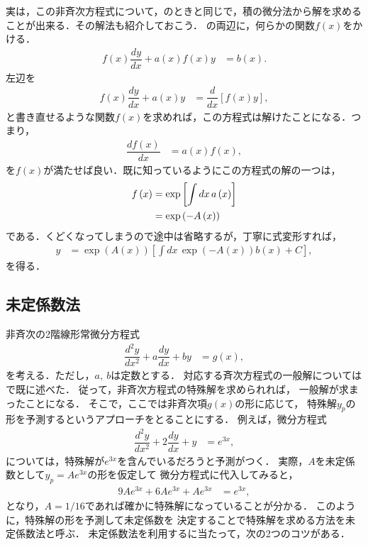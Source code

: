 実は，この非斉次方程式について，のときと同じで，積の微分法から解を求めることが出来る．その解法も紹介しておこう．
の両辺に，何らかの関数$f\left(x\right)$をかける．
\begin{align}
 f\left(x\right)\dfrac{dy}{dx}+a\left(x\right)f\left(x\right)y & =b\left(x\right).
\end{align}
左辺を
\begin{align}
  f\left(x\right)\dfrac{dy}{dx}+a\left(x\right)y & =\dfrac{d}{dx}\left[f\left(x\right)y\right],
\end{align}
と書き直せるような関数$f\left(x\right)$を求めれば，この方程式は解けたことになる．つまり，
\begin{align}
 \dfrac{df\left(x\right)}{dx} & =a\left(x\right)f\left(x\right),
\end{align}
を$f\left(x\right)$が満たせば良い．既に知っているようにこの方程式の解の一つは，
\begin{align}
 f\left(x\right) & =\exp\left[\int dx\,a\left(x\right)\right]\notag \\ 
                 & =\exp\left(-A\left(x\right)\right)
\end{align}
である．くどくなってしまうので途中は省略するが，丁寧に式変形すれば，
\begin{align}
 y & =\exp\left(A\left(x\right)\right)\left[\int dx\,\exp\left(-A\left(x\right)\right)b\left(x\right)+C\right],
\end{align}
を得る．
%
%
\subsection{未定係数法}
%
非斉次の2階線形常微分方程式
\begin{align}
\dfrac{d^{2}y}{dx^{2}}+a\dfrac{dy}{dx}+by & = g\left(x\right),
\label{eq:inhomo_linear2}
\end{align}
を考える．ただし，$a,~b$は定数とする．
対応する斉次方程式の一般解についてはで既に述べた．
従って，非斉次方程式の特殊解を求められれば，
一般解が求まったことになる．
そこで，ここでは非斉次項$g(x)$の形に応じて，
特殊解$y_p$の形を予測するというアプローチをとることにする．
例えば，微分方程式
\begin{align}
\dfrac{d^{2}y}{dx^{2}}+2\dfrac{dy}{dx}+y & =e^{3x},
\end{align}
については，特殊解が$e^{3x}$を含んでいるだろうと予測がつく．
実際，$A$を未定係数として$y_p = Ae^{3x}$の形を仮定して
微分方程式に代入してみると，
\begin{align}
9Ae^{3x}+6Ae^{3x}+Ae^{3x} & =e^{3x}, 
\end{align}
となり，$A=1/16$であれば確かに特殊解になっていることが分かる．
このように，特殊解の形を予測して未定係数を
決定することで特殊解を求める方法を未定係数法と呼ぶ．
未定係数法を利用するに当たって，次の2つのコツがある．

